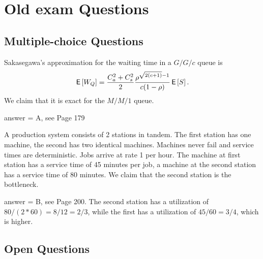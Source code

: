 \section{Old exam Questions}

\subsection{Multiple-choice Questions}

\begin{exercise}[201807]{1}
Sakasegawa's approximation for the waiting time in a $G/G/c$ queue is 
\begin{equation*}
  \,\mathsf{E}\left[W_Q\right] = \frac{C_a^2+C_s^2}2 \frac{\rho^{\sqrt{2(c+1)}-1}}{c(1-\rho)} \,\mathsf{E}\left[S\right].
\end{equation*}
We claim that it is exact for the $M/M/1$ queue.
\begin{solution}
answer = A, see Page 179
\end{solution}
\end{exercise}

\begin{exercise}[201807]{1}
  A production system consists of 2 stations in tandem. The first station has one machine, the second has two identical machines. Machines never fail and service times are deterministic. Jobs arrive at rate 1 per hour. The machine at first station has a service time of 45 minutes per job, a machine at the second station has a service time of 80 minutes. We claim that the second  station is the bottleneck. 
\begin{solution}
answer = B, see Page 200. The second station has a utilization of $80/(2*60) = 8/12 = 2/3$, while  the first has a utilization of $45/60 = 3/4$, which is higher.
\end{solution}
\end{exercise}



\subsection{Open Questions}



